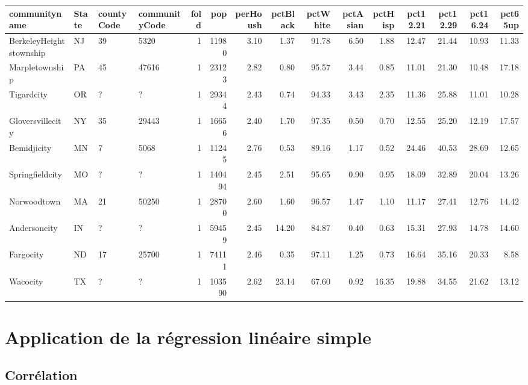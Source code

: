\documentclass[
]{book}
\begin{document}
\begin{tabular}{l|l|l|l|r|r|r|r|r|r|r|r|r|r|r}
\hline
communityname & State & countyCode & communityCode & fold & pop & perHoush & pctBlack & pctWhite & pctAsian & pctHisp & pct12.21 & pct12.29 & pct16.24 & pct65up\\
\hline
BerkeleyHeightstownship & NJ & 39 & 5320 & 1 & 11980 & 3.10 & 1.37 & 91.78 & 6.50 & 1.88 & 12.47 & 21.44 & 10.93 & 11.33\\
\hline
Marpletownship & PA & 45 & 47616 & 1 & 23123 & 2.82 & 0.80 & 95.57 & 3.44 & 0.85 & 11.01 & 21.30 & 10.48 & 17.18\\
\hline
Tigardcity & OR & ? & ? & 1 & 29344 & 2.43 & 0.74 & 94.33 & 3.43 & 2.35 & 11.36 & 25.88 & 11.01 & 10.28\\
\hline
Gloversvillecity & NY & 35 & 29443 & 1 & 16656 & 2.40 & 1.70 & 97.35 & 0.50 & 0.70 & 12.55 & 25.20 & 12.19 & 17.57\\
\hline
Bemidjicity & MN & 7 & 5068 & 1 & 11245 & 2.76 & 0.53 & 89.16 & 1.17 & 0.52 & 24.46 & 40.53 & 28.69 & 12.65\\
\hline
Springfieldcity & MO & ? & ? & 1 & 140494 & 2.45 & 2.51 & 95.65 & 0.90 & 0.95 & 18.09 & 32.89 & 20.04 & 13.26\\
\hline
Norwoodtown & MA & 21 & 50250 & 1 & 28700 & 2.60 & 1.60 & 96.57 & 1.47 & 1.10 & 11.17 & 27.41 & 12.76 & 14.42\\
\hline
Andersoncity & IN & ? & ? & 1 & 59459 & 2.45 & 14.20 & 84.87 & 0.40 & 0.63 & 15.31 & 27.93 & 14.78 & 14.60\\
\hline
Fargocity & ND & 17 & 25700 & 1 & 74111 & 2.46 & 0.35 & 97.11 & 1.25 & 0.73 & 16.64 & 35.16 & 20.33 & 8.58\\
\hline
Wacocity & TX & ? & ? & 1 & 103590 & 2.62 & 23.14 & 67.60 & 0.92 & 16.35 & 19.88 & 34.55 & 21.62 & 13.12\\
\hline
\end{tabular}

\hypertarget{application-de-la-ruxe9gression-linuxe9aire-simple}{%
\section{Application de la régression linéaire simple}\label{application-de-la-ruxe9gression-linuxe9aire-simple}}

\hypertarget{corruxe9lation}{%
\subsection*{Corrélation}\label{corruxe9lation}}
\end{document}
